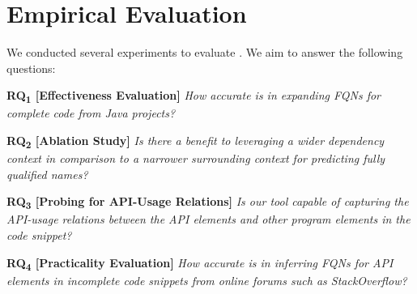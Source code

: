 \section{Empirical Evaluation}
\label{sec:eval}


We conducted several experiments to evaluate {\tool}. We aim to answer the following questions:

\vspace{2pt}
\noindent \textbf{RQ\textsubscript{1} 
  [Effectiveness Evaluation]} {\em How accurate is {\tool} in expanding FQNs for complete code from Java projects?}

\vspace{2pt}
\noindent \textbf{RQ\textsubscript{2} 
[Ablation Study]}  {\em Is there a benefit to leveraging a wider dependency context in comparison to a narrower surrounding context for predicting fully qualified names?}

\vspace{2pt}
\noindent \textbf{RQ\textsubscript{3} [Probing for API-Usage Relations]} {\em Is our tool capable of capturing the API-usage relations between the API elements and other program elements in the code snippet?}

\vspace{2pt}
\noindent \textbf{RQ\textsubscript{4} 
[Practicality Evaluation]}  {\em How accurate is {\tool} in 
inferring FQNs for API elements in incomplete code snippets from online forums such as StackOverflow?}

%
